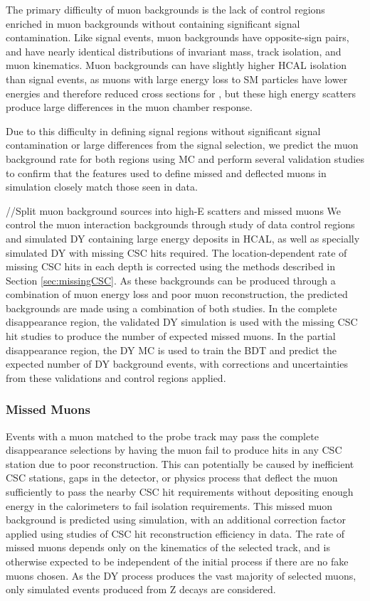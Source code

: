 The primary difficulty of muon backgrounds is the lack of control regions enriched in muon backgrounds without containing significant signal contamination.
Like signal events, muon backgrounds have opposite-sign pairs, and have nearly identical distributions of invariant mass, track isolation, and muon kinematics.
Muon backgrounds can have slightly higher HCAL isolation than signal events, as muons with large energy loss to SM particles have lower energies and therefore reduced cross sections for \dbrem, but these high energy scatters produce large differences in the muon chamber response.

Due to this difficulty in defining signal regions without significant signal contamination or large differences from the signal selection, we predict the muon background rate for both regions using MC and perform several validation studies to confirm that the features used to define missed and deflected muons in simulation closely match those seen in data.




//Split muon background sources into high-E scatters and missed muons
We control the muon interaction backgrounds through study of data control regions and simulated DY containing large energy deposits in HCAL, as well as specially simulated DY with missing CSC hits required. The location-dependent rate of missing CSC hits in each depth is corrected using the methods described in Section \ref{sec:missingCSC}.
As these backgrounds can be produced through a combination of muon energy loss and poor muon reconstruction, the predicted backgrounds are made using a combination of both studies. In the complete disappearance region, the validated DY simulation is used with the missing CSC hit studies to produce the number of expected missed muons. In the partial disappearance region, the DY MC is used to train the BDT and predict the expected number of DY background events, with corrections and uncertainties from these validations and control regions applied.
\subsubsection{Missed Muons}

Events with a muon matched to the probe track may pass the complete disappearance selections by having the muon fail to produce hits in any CSC station due to poor reconstruction. This can potentially be caused by inefficient CSC stations, gaps in the detector, or physics process that deflect the muon sufficiently to pass the nearby CSC hit requirements without depositing enough energy in the calorimeters to fail isolation requirements. This missed muon background is predicted using simulation, with an additional correction factor applied using studies of CSC hit reconstruction efficiency in data. The rate of missed muons depends only on the kinematics of the selected track, and is otherwise expected to be independent of the initial process if there are no fake muons chosen. As the DY process produces the vast majority of selected muons, only simulated events produced from Z decays are considered.

